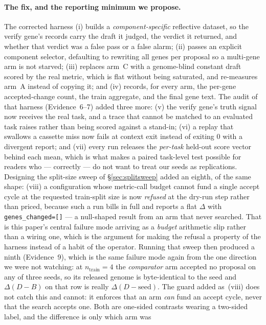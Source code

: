 \documentclass[11pt]{article}
\newcommand{\dd}{\ensuremath{\Delta}}
\begin{document}
\paragraph{The fix, and the reporting minimum we propose.}
The corrected harness (i) builds a \emph{component-specific} reflective dataset, so the verify
gene's records carry the draft it judged, the verdict it returned, and whether that verdict
was a false pass or a false alarm; (ii) passes an explicit component selector, defaulting to
rewriting all genes per proposal so a multi-gene arm is not starved; (iii) replaces arm~C
with a genome-blind constant draft scored by the real metric, which is flat without being
saturated, and re-measures arm~A instead of copying it; and (iv) records, for every arm, the
per-gene accepted-change count, the train aggregate, and the final gene text. The audit of
that harness (Evidence~6--7) added three more: (v) the verify gene's truth signal now receives
the real task, and a trace that cannot be matched to an evaluated task raises rather than being
scored against a stand-in; (vi) a replay that swallows a cassette miss now fails at context
exit instead of exiting $0$ with a divergent report; and (vii) every run releases the
\emph{per-task} held-out score vector behind each mean, which is what makes a paired
task-level test possible for readers who --- correctly --- do not want to treat our seeds as
replications. Designing the split-size sweep of \S\ref{sec:splitsweep} added an eighth, of the
same shape: (viii) a configuration whose metric-call budget cannot fund a single accept cycle
at the requested train-split size is now \emph{refused} at the dry-run step rather than
priced, because such a run bills in full and reports a flat $\dd$ with
\texttt{genes\_changed=[]} --- a null-shaped result from an arm that never searched. That is
this paper's central failure mode arriving as a \emph{budget} arithmetic slip rather than a
wiring one, which is the argument for making the refusal a property of the harness instead of
a habit of the operator. Running that sweep then produced a ninth (Evidence~9), which is the
same failure mode again from the one direction we were not watching: at
$n_{\mathrm{train}}{=}4$ the \emph{comparator} arm accepted no proposal on any of three seeds,
so its released genome is byte-identical to the seed and $\dd(D-B)$ on that row is really
$\dd(D-\mathrm{seed})$. The guard added as~(viii) does not catch this and cannot: it enforces
that an arm \emph{can} fund an accept cycle, never that the search accepts one. Both are
one-sided contrasts wearing a two-sided label, and the difference is only which arm was
\end{document}
